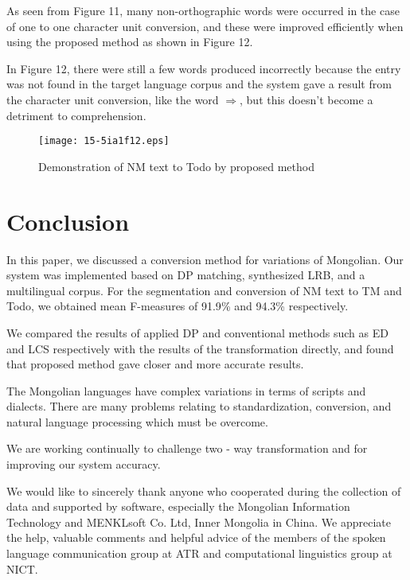 \documentclass[english]{jnlp_1.4}
\begin{document}
As seen from Figure 11, many non-orthographic words were occurred in the 
case of one to one character unit conversion, and these were improved 
efficiently when using the proposed method as shown in Figure 12.
\pagebreak

In Figure 12, there were still a few words produced incorrectly because the 
entry was not found in the target language corpus and the system gave a 
result from the character unit conversion, like the word $\Rightarrow$, 
but this doesn't become a detriment to 
comprehension.

\begin{figure}[t]
\centerline{\texttt{[image: 15-5ia1f12.eps]}}
\caption{Demonstration of NM text to Todo by proposed method}
\label{fig39}
\end{figure}



\section{Conclusion}

In this paper, we discussed a conversion method for variations of Mongolian. 
Our system was implemented based on DP matching, synthesized LRB, and a 
multilingual corpus. For the segmentation and conversion of NM text to TM 
and Todo, we obtained mean F-measures of 91.9{\%} and 94.3{\%} respectively.

We compared the results of applied DP and conventional methods such as ED 
and LCS respectively with the results of the transformation directly, and 
found that proposed method gave closer and more accurate results.

The Mongolian languages have complex variations in terms of scripts and 
dialects. There are many problems relating to standardization, conversion, 
and natural language processing which must be overcome.

We are working continually to challenge two - way transformation and for 
improving our system accuracy.


\acknowledgment

We would like to sincerely thank anyone who cooperated during the collection 
of data and supported by software, especially the Mongolian Information 
Technology and MENKLsoft Co. Ltd, Inner Mongolia in China. We appreciate the 
help, valuable comments and helpful advice of the members of the spoken 
language communication group at ATR and computational linguistics group at 
NICT.
\end{document}
